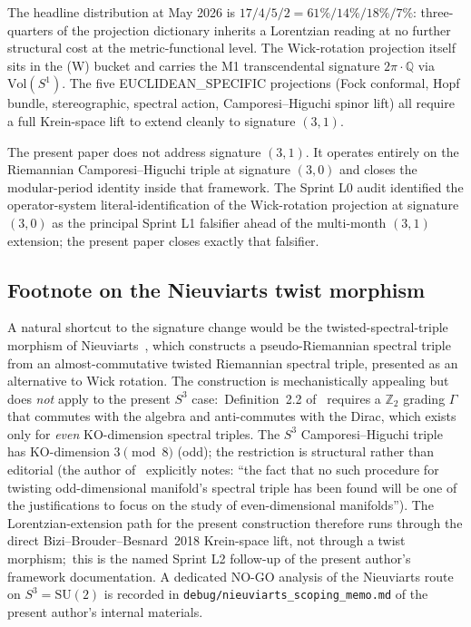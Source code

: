 \documentclass[11pt,a4paper]{article}
\theoremstyle{plain}
\theoremstyle{definition}
\newcommand{\sthree}{S^{3}}
\newcommand{\Z}{\mathbb{Z}}
\newcommand{\Q}{\mathbb{Q}}
\newcommand{\SU}{\mathrm{SU}}
\newcommand{\Vol}{\mathrm{Vol}}
\begin{document}
The headline distribution at May 2026 is
$17 / 4 / 5 / 2 = 61\% / 14\% / 18\% / 7\%$: three-quarters of the
projection dictionary inherits a Lorentzian reading at no further
structural cost at the metric-functional level. The Wick-rotation
projection itself sits in the (W) bucket and carries the M1
transcendental signature $2\pi \cdot \Q$ via $\Vol(S^1)$. The
five EUCLIDEAN\_SPECIFIC projections (Fock conformal, Hopf bundle,
stereographic, spectral action, Camporesi--Higuchi spinor lift) all
require a full Krein-space lift to extend cleanly to signature
$(3, 1)$.

The present paper does not address signature $(3, 1)$. It operates
entirely on the Riemannian Camporesi--Higuchi triple at signature
$(3, 0)$ and closes the modular-period identity inside that framework.
The Sprint L0 audit identified the operator-system literal-identification
of the Wick-rotation projection at signature $(3, 0)$ as the principal
Sprint L1 falsifier ahead of the multi-month $(3, 1)$ extension; the
present paper closes exactly that falsifier.

\subsection{Footnote on the Nieuviarts twist morphism}
\label{sec:nieuviarts_footnote}

A natural shortcut to the signature change would be the
twisted-spectral-triple morphism of
Nieuviarts~\cite{nieuviarts2025a, nieuviarts2024, nieuviarts2025b_proceedings},
which constructs a pseudo-Riemannian spectral triple from an
almost-commutative twisted Riemannian spectral triple, presented as
an alternative to Wick rotation. The construction is mechanistically
appealing but does \emph{not} apply to the present $\sthree$ case:\
Definition~2.2 of~\cite{nieuviarts2025a} requires a $\Z_2$ grading
$\Gamma$ that commutes with the algebra and anti-commutes with the
Dirac, which exists only for \emph{even} KO-dimension spectral
triples. The $\sthree$ Camporesi--Higuchi triple has KO-dimension
$3 \pmod 8$ (odd); the restriction is structural rather than
editorial (the author of~\cite{nieuviarts2025a} explicitly notes:
``the fact that no such procedure for twisting odd-dimensional
manifold's spectral triple has been found will be one of the
justifications to focus on the study of even-dimensional manifolds'').
The Lorentzian-extension path for the present construction therefore
runs through the direct Bizi--Brouder--Besnard~2018 Krein-space lift,
not through a twist morphism;\ this is the named Sprint L2 follow-up
of the present author's framework documentation. A dedicated NO-GO
analysis of the Nieuviarts route on $\sthree = \SU(2)$ is recorded in
\texttt{debug/nieuviarts\_scoping\_memo.md} of the present author's
internal materials.
\end{document}
